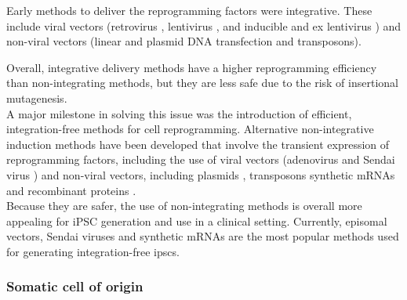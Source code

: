 Early methods to deliver the reprogramming factors were integrative.
These include viral vectors (retrovirus \cite{takahashi2006induction, takahashi2007induction, wernig2007vitro, okita2007generation, yamanaka2007strategies, maherali2007directly}, lentivirus \cite{yu2007induced, blelloch2007generation}, and 
inducible and 
ex \cite{soldner2009parkinson}
lentivirus \cite{maherali2008high}) and 
non-viral vectors (linear and plasmid DNA transfection \cite{kaji2009virus} and transposons). 

Overall, integrative delivery methods have a higher reprogramming efficiency than non-integrating methods, but they are less safe due to the risk of insertional mutagenesis. \\

A major milestone in solving this issue was the introduction of efficient, integration-free methods for cell reprogramming. 
Alternative non-integrative induction methods have been developed that involve the transient expression of reprogramming factors, including the use of viral vectors (adenovirus \cite{stadtfeld2008reprogramming} and Sendai virus \cite{fusaki2009efficient, nishimura2011development}) and non-viral vectors, including plasmids \cite{yu2009human, okita2008generation, okita2011more, jia2010nonviral}, transposons \cite{kaji2009virus, woltjen2009piggybac, yu2009human} synthetic mRNAs \cite{warren2010highly} and recombinant proteins \cite{kim2009generation}. \\

Because they are safer, the use of non-integrating methods is overall more appealing for iPSC generation and use in a clinical setting.
Currently, episomal vectors, Sendai viruses and synthetic mRNAs are the most popular methods used for generating integration-free \glspl{ipsc}. 




\subsubsection{Somatic cell of origin}

